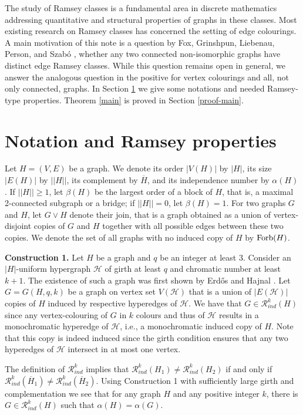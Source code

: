 \documentclass[10pt,a4paper]{article}
\theoremstyle{plain}
\theoremstyle{definition}
\newcommand{\cH}{\mathcal{H}}
\newcommand{\R}{\mathcal{R}}
\newcommand{\Forb}{{\rm Forb}}
\newcommand{\Rk}{\R_{ind}}
\begin{document}
 
 
The study of Ramsey classes is a fundamental area in discrete mathematics addressing quantitative and structural properties of graphs in these classes.
Most existing  research  on Ramsey classes has concerned the setting of  edge colourings. A main motivation of this note is a question by  Fox,  Grinshpun, Liebenau, Person, and Szab\'o \cite{F}, whether any two connected non-isomorphic graphs have distinct edge Ramsey classes. While this question remains open in general,  we answer the  analogous question in the positive  for vertex colourings and all, not only connected, graphs. In Section \ref{sec:notations} we give some notations and needed Ramsey-type properties. Theorem \ref{main} is proved in Section \ref{proof-main}.



   
 \section{Notation and Ramsey properties}\label{sec:notations}
Let $H=(V, E)$ be a graph. We denote its order  $|V(H)|$ by $|H|$, its size $|E(H)|$ by $||H||$, its complement by $\overline{H}$, and 
its independence number by  $\alpha(H)$. If $||H||\geq 1$, let $\beta(H)$ be the largest order of a block of $H$, that is, a maximal 2-connected subgraph or a bridge; if $||H||=0$, let $\beta(H)=1$. For two graphs $G$ and $H$, let $G\vee H$ denote their join, that is a graph obtained as a union of vertex-disjoint copies of $G$ and $H$ together with all possible edges between these two copies.
 We denote the set of all graphs with no induced copy of $H$ by $\Forb(H)$.
 
 
 {\bf Construction 1.} Let $H$ be a graph and $q$ be an integer at least $3$.  Consider an  $|H|$-uniform hypergraph $\cH$ of girth at least $q$ and chromatic number at least $k+1$. The existence of such a graph was first shown by Erd\H{o}s and Hajnal \cite{EH}.
 Let $G=G(H, q, k)$ be a graph on vertex set $V(\cH)$ that is a union of $|E(\cH)|$ copies of $H$ induced by respective hyperedges of $\cH$. 
 We have that $G\in \Rk^k(H)$ since any vertex-colouring of $G$ in $k$ colours  and thus of $\cH$ results in a monochromatic hyperedge of $\cH$, i.e., a monochromatic induced copy of $H$. Note that this copy is indeed induced since the girth condition ensures that any two hyperedges of $\cH$ intersect in at most one vertex.

The definition of $\Rk^k$ implies that  $\R_{ind}^k(H_1) \neq \R_{ind}^k(H_2)$ if and only if $\R_{ind}^k(\overline{H}_1) \neq \R_{ind}^k(\overline{H}_2)$.
Using Construction 1 with sufficiently large girth and complementation we see  that for any graph $H$  and any positive integer $k$, there is $G \in \R_{ind}^k(H)$ such that $\alpha(H)=\alpha(G)$.
  
\end{document}
